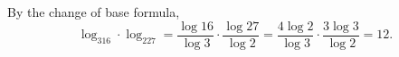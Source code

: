 By the change of base formula,
\[\log_316\cdot\log_227=\dfrac{\log16}{\log3}\cdot\dfrac{\log27}{\log2}=\dfrac{4\log2}{\log3}\cdot\dfrac{3\log3}{\log2}=\boxed{12}.\]
